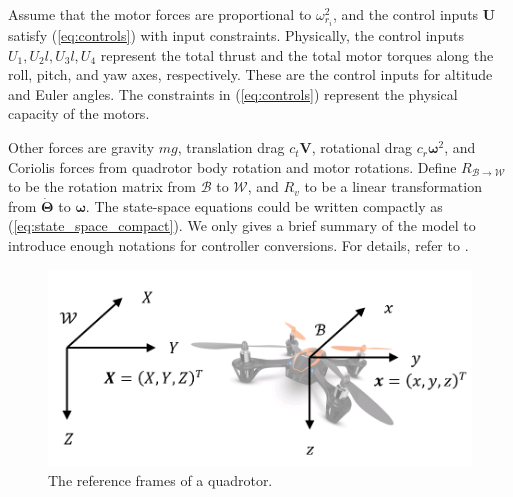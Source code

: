 \documentclass[journal,11pt,onecolumn,draftclsnofoot,]{IEEEtran}
\begin{document}
Assume that the motor forces are proportional to $\omega _{r_i}^2$, and the control inputs $\boldsymbol{U}$ satisfy (\ref{eq:controls}) with input constraints. Physically, the control inputs $U_1, U_2l, U_3l, U_4$ represent the total thrust and the total motor torques along the roll, pitch, and yaw axes, respectively. These are the control inputs for altitude and Euler angles. The constraints in (\ref{eq:controls}) represent the physical capacity of the motors.

Other forces are gravity $mg$, translation drag $c_t \boldsymbol{V}$, rotational drag $c_r \boldsymbol{\omega}^2$, and Coriolis forces from quadrotor body rotation and motor rotations. Define $R_{\mathcal{B}\rightarrow \mathcal{W}}$ to be the rotation matrix from $\mathcal{B}$ to $\mathcal{W}$, and $R_v$ to be a linear transformation from $\boldsymbol{\dot{\Theta}}$ to $\boldsymbol{\omega}$. The state-space equations could be written compactly as (\ref{eq:state_space_compact}). We only gives a brief summary of the model to introduce enough notations for controller conversions. For details, refer to \cite{bouadi2011adaptive}.

\begin{figure}
	\centering
	\includegraphics[width=0.5\columnwidth]{frames_quadrotor}
	\caption{The reference frames of a quadrotor.}
	\label{fig:frames}

\end{figure}
\end{document}
